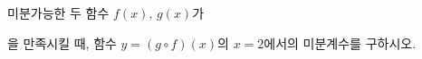 미분가능한 두 함수 $f(x)$, $g(x)$가 \par\smallskip{}\par\smallskip\noindent 을 만족시킬 때, 함수 $y=(g\circ f)(x)$의 $x=2$에서의 미분계수를 구하시오.
